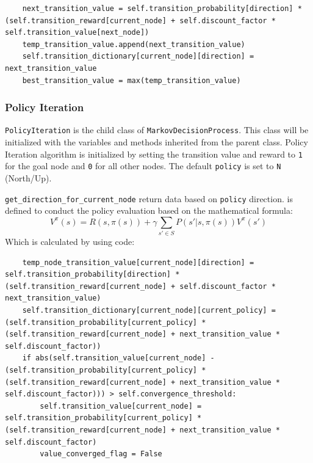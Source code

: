 \documentclass{article}
\begin{document}
\begin{lstlisting}
    next_transition_value = self.transition_probability[direction] * (self.transition_reward[current_node] + self.discount_factor * self.transition_value[next_node])
    temp_transition_value.append(next_transition_value)
    self.transition_dictionary[current_node][direction] = next_transition_value
    best_transition_value = max(temp_transition_value)
\end{lstlisting}

\subsubsection{Policy Iteration}
\texttt{PolicyIteration} is the child class of \texttt{MarkovDecisionProcess}.
This class will be initialized with the variables and methods inherited from the parent class.
Policy Iteration algorithm is initialized by setting the transition value and reward to \texttt{1} for the goal node and \texttt{0} for all other nodes.
The default \texttt{policy} is set to \texttt{N} (North/Up).

\texttt{get\_direction\_for\_current\_node} return data based on \texttt{policy} direction.
     is defined to conduct the policy evaluation based on the mathematical formula:
\[ V^{\pi}(s) = R(s, \pi(s)) + \gamma \sum_{s' \in S} P(s'|s, \pi(s)) V^{\pi}(s') \]
Which is calculated by using code:
\begin{lstlisting}
    temp_node_transition_value[current_node][direction] = self.transition_probability[direction] * (self.transition_reward[current_node] + self.discount_factor * next_transition_value)
    self.transition_dictionary[current_node][current_policy] = (self.transition_probability[current_policy] * (self.transition_reward[current_node] + next_transition_value * self.discount_factor))
    if abs(self.transition_value[current_node] - (self.transition_probability[current_policy] * (self.transition_reward[current_node] + next_transition_value * self.discount_factor))) > self.convergence_threshold:
        self.transition_value[current_node] = self.transition_probability[current_policy] * (self.transition_reward[current_node] + next_transition_value * self.discount_factor)
        value_converged_flag = False
\end{lstlisting}
\end{document}
